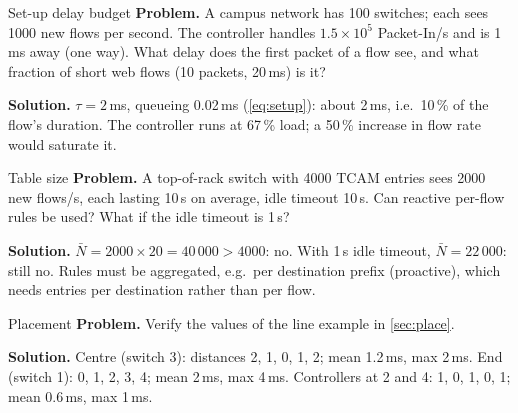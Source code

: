 \documentclass[11pt,a4paper]{article}
\begin{document}
\begin{examplebox}{Set-up delay budget}\label{ex:setup}
\textbf{Problem.} A campus network has 100 switches; each sees 1000 new flows per second. The controller handles
$1.5\times10^5$ Packet-In/s and is 1\,ms away (one way). What delay does the first packet of a flow see, and what
fraction of short web flows (10 packets, 20\,ms) is it?

\textbf{Solution.} $\tau = 2$\,ms, queueing 0.02\,ms (\cref{eq:setup}): about 2\,ms, i.e.\ 10\,\% of the flow's duration.
The controller runs at 67\,\% load; a 50\,\% increase in flow rate would saturate it.
\end{examplebox}

\begin{examplebox}{Table size}\label{ex:table}
\textbf{Problem.} A top-of-rack switch with 4000 TCAM entries sees 2000 new flows/s, each lasting 10\,s on average,
idle timeout 10\,s. Can reactive per-flow rules be used? What if the idle timeout is 1\,s?

\textbf{Solution.} $\bar N = 2000\times20 = 40\,000 > 4000$: no. With 1\,s idle timeout, $\bar N = 22\,000$: still no.
Rules must be aggregated, e.g.\ per destination prefix (proactive), which needs entries per destination rather
than per flow.
\end{examplebox}

\begin{examplebox}{Placement}\label{ex:place}
\textbf{Problem.} Verify the values of the line example in \cref{sec:place}.

\textbf{Solution.} Centre (switch 3): distances 2, 1, 0, 1, 2; mean 1.2\,ms, max 2\,ms. End (switch 1): 0, 1, 2, 3, 4; mean
2\,ms, max 4\,ms. Controllers at 2 and 4: 1, 0, 1, 0, 1; mean 0.6\,ms, max 1\,ms.
\end{examplebox}

\end{document}
